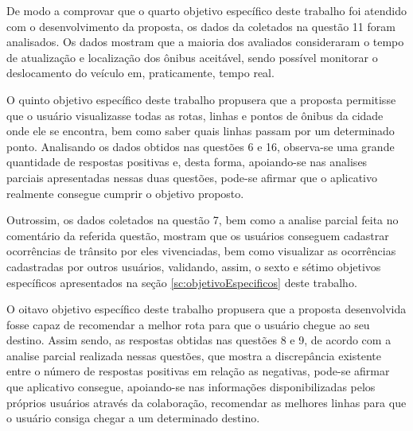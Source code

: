 De modo a comprovar que o quarto objetivo específico deste trabalho foi atendido com o desenvolvimento da proposta, os dados da coletados na questão 11 foram analisados. Os dados mostram que a maioria dos avaliados consideraram o tempo de atualização e localização dos ônibus aceitável, sendo possível monitorar o deslocamento do veículo em, praticamente, tempo real.
	
O quinto objetivo específico deste trabalho propusera que a proposta permitisse que o usuário visualizasse todas as rotas, linhas e pontos de ônibus da cidade onde ele se encontra, bem como saber quais linhas passam por um determinado ponto. Analisando os dados obtidos nas questões 6 e 16, observa-se uma grande quantidade de respostas positivas e, desta forma, apoiando-se nas analises parciais apresentadas nessas duas questões, pode-se afirmar que o aplicativo realmente consegue cumprir o objetivo proposto.
	
Outrossim, os dados coletados na questão 7, bem como a analise parcial feita no comentário da referida questão, mostram que os usuários conseguem cadastrar ocorrências de trânsito por eles vivenciadas, bem como visualizar as ocorrências cadastradas por outros usuários, validando, assim, o sexto e sétimo objetivos específicos apresentados na seção \ref{sc:objetivoEspecificos} deste trabalho.  
	
O oitavo objetivo específico deste trabalho propusera que a proposta desenvolvida fosse capaz de recomendar a melhor rota para que o usuário chegue ao seu destino. Assim sendo, as respostas obtidas nas questões 8 e 9, de acordo com a analise parcial realizada nessas questões, que mostra a discrepância existente entre o número de respostas positivas em relação as negativas, pode-se afirmar que aplicativo consegue, apoiando-se nas informações disponibilizadas pelos próprios usuários através da colaboração, recomendar as melhores linhas para que o usuário consiga chegar a um determinado destino.

	





